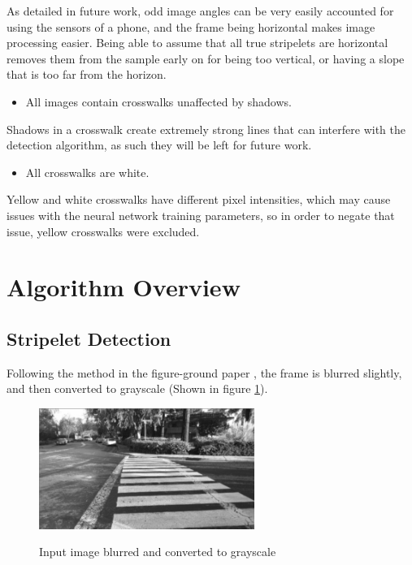 \documentclass[12pt]{ucthesis}
\newcommand{\captionfonts}{\small\bf\ssp}
\begin{document}
As detailed in future work, odd image angles can be very easily accounted for using the sensors of a phone, and the frame being horizontal makes image processing easier. Being able to assume that all true stripelets are horizontal removes them from the sample early on for being too vertical, or having a slope that is too far from the horizon. 

\begin{itemize}
\item All images contain crosswalks unaffected by shadows.
\end{itemize}

Shadows in a crosswalk create extremely strong lines that can interfere with the detection algorithm, as such they will be left for future work. 

\begin{itemize}
\item All crosswalks are white.
\end{itemize}

Yellow and white crosswalks have different pixel intensities, which may cause issues with the neural network training parameters, so in order to negate that issue, yellow crosswalks were excluded. 

\section{Algorithm Overview}
\label{Algorithm Overview}

\subsection{Stripelet Detection}

Following the method in the figure-ground paper \cite{Coughlan2006}, the frame is blurred slightly, and then converted to grayscale (Shown in figure \ref{fig:SlightlyBlurred}). 

\begin{figure}[t]
\begin{center}
\includegraphics[width=7cm]{SlightlyBlurredInput.png}
\captionfonts
\caption[Grayscale Image]{Input image blurred and converted to grayscale}
\label{fig:SlightlyBlurred}
\end{center}
\end{figure}
\end{document}
